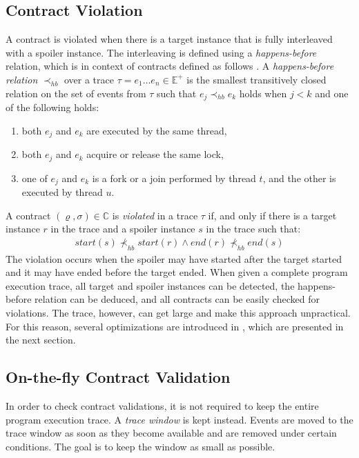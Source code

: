 \subsection{Contract Violation}

A contract is violated when there is a target instance that is fully interleaved
with a spoiler instance. The interleaving is defined using a
\emph{happens-before} relation, which is in context of contracts defined as
follows \cite{contracts}. A \emph{happens-before relation} $\prec_{hb}$ over a
trace $\tau = e_1 \ldots e_n \in \mathbb{E}^+$ is the smallest transitively
closed relation on the set of events from $\tau$ such that $e_j \prec_{hb} e_k$
holds when $j < k$ and one of the following holds:
\begin{enumerate}
    \item both $e_j$ and $e_k$ are executed by the same thread,
    \item both $e_j$ and $e_k$ acquire or release the same lock,
    \item one of $e_j$ and $e_k$ is a fork or a join performed by thread $t$,
        and the other is executed by thread $u$.
\end{enumerate}

A contract $(\varrho,\sigma) \in \mathbb{C}$ is \emph{violated} in a trace
$\tau$ if, and only if there is a target instance $r$ in the trace and a spoiler
instance $s$ in the trace such that:
\begin{align*}
    start(s) \nprec_{hb} start(r) \wedge end(r) \nprec_{hb} end(s)
\end{align*}
The violation occurs when the spoiler may have started after the target started
and it may have ended before the target ended. When given a complete program
execution trace, all target and spoiler instances can be detected, the
happens-before relation can be deduced, and all contracts can be easily checked
for violations. The trace, however, can get large and make this approach
unpractical. For this reason, several optimizations are introduced in
\cite{contracts}, which are presented in the next section.


\subsection{On-the-fly Contract Validation}

In order to check contract validations, it is not required to keep the entire
program execution trace. A \emph{trace window} is kept instead. Events are moved
to the trace window as soon as they become available and are removed under
certain conditions. The goal is to keep the window as small as possible.


